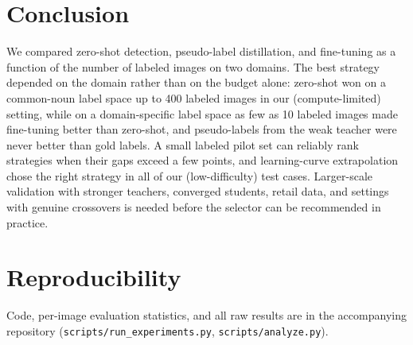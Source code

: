 \section{Conclusion}
We compared zero-shot detection, pseudo-label distillation, and fine-tuning as a function of the number of labeled images on two domains. The best strategy depended on the domain rather than on the budget alone: zero-shot won on a common-noun label space up to 400 labeled images in our (compute-limited) setting, while on a domain-specific label space as few as 10 labeled images made fine-tuning better than zero-shot, and pseudo-labels from the weak teacher were never better than gold labels. A small labeled pilot set can reliably rank strategies when their gaps exceed a few points, and learning-curve extrapolation chose the right strategy in all of our (low-difficulty) test cases. Larger-scale validation with stronger teachers, converged students, retail data, and settings with genuine crossovers is needed before the selector can be recommended in practice.

\section*{Reproducibility}
Code, per-image evaluation statistics, and all raw results are in the accompanying repository (\texttt{scripts/run\_experiments.py}, \texttt{scripts/analyze.py}).




